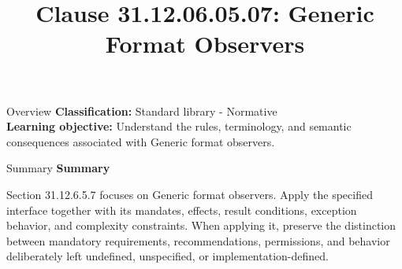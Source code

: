 \documentclass[10pt,letterpaper]{article}
\title{Clause 31.12.06.05.07: Generic Format Observers}
\author{}
\date{}
\begin{document}
\maketitle
\begin{CornellOverviewBox}{Overview}
\textbf{Classification:} Standard library - Normative\\[2pt]
\textbf{Learning objective:} Understand the rules, terminology, and semantic consequences associated with Generic format observers.
\end{CornellOverviewBox}\begin{CornellSummaryBox}{Summary}
{\sffamily\bfseries\color{Accent} Summary}\par\vspace{3pt}Section 31.12.6.5.7 focuses on Generic format observers. Apply the specified interface together with its mandates, effects, result conditions, exception behavior, and complexity constraints. When applying it, preserve the distinction between mandatory requirements, recommendations, permissions, and behavior deliberately left undefined, unspecified, or implementation-defined.
\end{CornellSummaryBox}
\end{document}
